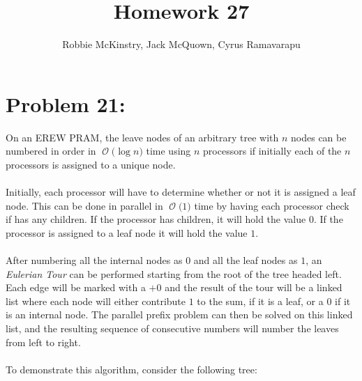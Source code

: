 \documentclass[12pt]{article}
\newcommand{\BigO}[1]{\ensuremath{\operatorname{\mathcal{O}}\bigl(#1\bigr)}}
\begin{document}
\title{Homework 27}
\author{Robbie McKinstry, Jack McQuown, Cyrus Ramavarapu}
\renewcommand{\today}{04 November 2016}
\renewcommand{\baselinestretch}{1.5}
\maketitle

\section*{Problem 21: }
On an EREW PRAM, the leave nodes of an arbitrary tree with $n$ nodes
can be numbered in order in \BigO{\log n} time using $n$ processors
if initially each of the $n$ processors is assigned to a unique node.\\\\
Initially, each processor will have to determine whether or not it is
assigned a leaf node.  This can be done in parallel in \BigO{1} time
by having each processor check if has any children.  If the processor
has children, it will hold the value $0$.  If the processor is 
assigned to a leaf node it will hold the value $1$.\\\\
After numbering all the internal nodes as $0$ and all the leaf nodes as
$1$, an \textit{Eulerian Tour} can be performed starting from the root
of the tree headed left.  Each edge will be marked with a $+0$ and the
result of the tour will be a linked list where each node will either
contribute $1$ to the sum, if it is a leaf, or a $0$ if it is an internal
node.  The parallel prefix problem can then be solved on this linked list,
and the resulting sequence of consecutive numbers will number the leaves
from left to right.\\\\
To demonstrate this algorithm, consider the following tree:\\\\  
\begin{center}
\end{center} 
\end{document}
